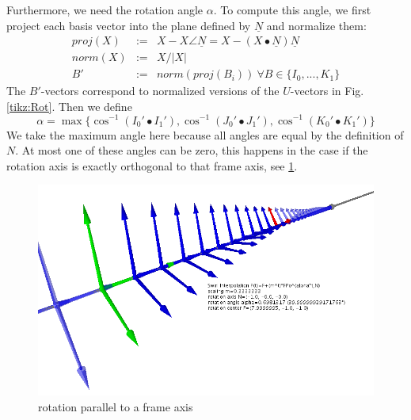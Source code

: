 \documentclass[tikz, journal, letterpaper]{IEEEtran}
\begin{document}
Furthermore, we need the rotation angle $\alpha$. To compute this angle, we first project each basis vector into the plane defined by $\underline{N}$ and normalize them:
\begin{equation}
\begin{array}{lcl}
 proj(X) &:=& X - X\angle\underline{N} = X - (X \bullet \underline{N})\underline{N} \\
 norm(X) &:=& X / |X| \\
 B' &:=& norm(proj(B_i)) \ \forall B \in \{I_0,...,K_1\}
\end{array}
\label{eq:ProjBasis}
\end{equation}
The $B'$-vectors correspond to normalized versions of the $U$-vectors in Fig. \ref{tikz:Rot}.
Then we define
\begin{equation}
 \alpha = \max \{ \cos^{-1}(I_0' \bullet I_1'), \cos^{-1}(J_0' \bullet J_1'), \cos^{-1}(K_0' \bullet K_1') \}
\label{eq:}
\end{equation}
We take the maximum angle here because all angles are equal by the definition of $N$. At most one of these angles can be zero, this happens in the case if the rotation axis is exactly orthogonal to that frame axis, see \ref{fig:P1}.
\begin{figure}
	\centering
		\includegraphics[scale=0.4]{pictures/P1.png}
	\caption{rotation parallel to a frame axis}
	\label{fig:P1}
\end{figure}
\end{document}
